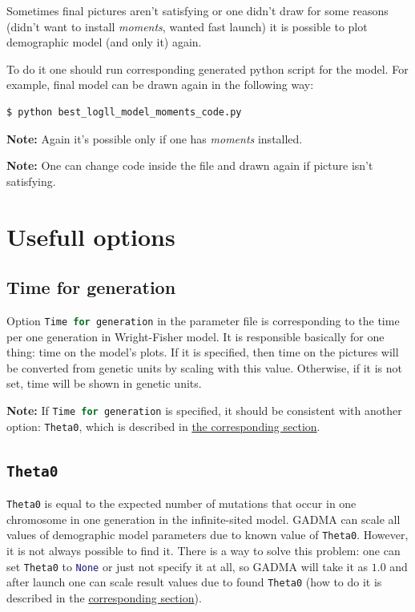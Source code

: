 \documentclass[12pt]{article}
\makeatletter
\newcommand{\moments}{\textit{moments}\xspace}
\newcommand{\py}[1]{\lstinline[language=Python, showstringspaces=False]@#1@}
\makeatother
\begin{document}
Sometimes final pictures aren't satisfying or one didn't draw for some reasons (didn't want to install \moments, wanted fast launch) it is possible to plot demographic model (and only it) again.

To do it one should run corresponding generated python script for the model. For example, final model can be drawn again in the following way:
\begin{lstlisting}
$ python best_logll_model_moments_code.py
\end{lstlisting}

\textbf{Note:} Again it's possible only if one has \moments installed.

\textbf{Note:} One can change code inside the file and drawn again if picture isn't satisfying.

\section{Usefull options}
\subsection{Time for generation}
Option \py{Time for generation} in the parameter file is corresponding to the time per one generation in Wright-Fisher model. It is responsible basically for one thing: time on the model's plots. If it is specified, then time on the pictures will be converted from genetic units by scaling with this value. Otherwise, if it is not set, time will be shown in genetic units. 

\textbf{Note:} If \py{Time for generation} is specified, it should be consistent with another option: \py{Theta0}, which is described in \hyperref[sec:est-theta]{the corresponding section}.

\subsection{\py{Theta0}}
\py{Theta0} is equal to the expected number of mutations that occur in one chromosome in one generation in the infinite-sited model. GADMA can scale all values of demographic model parameters due to known value of \py{Theta0}. However, it is not always possible to find it. There is a way to solve this problem: one can set \py{Theta0} to \py{None} or just not specify it at all, so GADMA will take it as $1.0$ and after launch one can scale result values due to found \py{Theta0} (how to do it is described in the \hyperref[sec:change-theta]{corresponding section}). 
\end{document}
